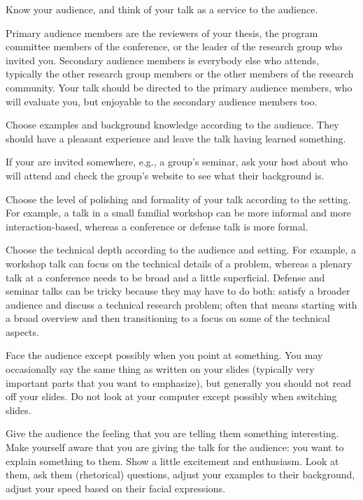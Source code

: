 \documentclass[12pt]{article}
\begin{document}
Know your audience, and think of your talk as a service to the audience.
\begin{compactitem}
\item Primary audience members are the reviewers of your thesis, the program committee members of the conference, or the leader of the research group who invited you.
Secondary audience members is everybody else who attends, typically the other research group members or the other members of the research community.
Your talk should be directed to the primary audience members, who will evaluate you, but enjoyable to the secondary audience members too.
\item Choose examples and background knowledge according to the audience. They should have a pleasant experience and leave the talk having learned something.
\item If your are invited somewhere, e.g., a group's seminar, ask your host about who will attend and check the group's website to see what their background is.
\item Choose the level of polishing and formality of your talk according to the setting.
For example, a talk in a small familial workshop can be more informal and more interaction-based, whereas a conference or defense talk is more formal.
\item Choose the technical depth according to the audience and setting. For example, a workshop talk can focus on the technical details of a problem, whereas a plenary talk at a conference needs to be broad and a little superficial.
Defense and seminar talks can be tricky because they may have to do both: satisfy a broader audience and discuss a technical research problem; often that means starting with a broad overview and then transitioning to a focus on some of the technical aspects.
\end{compactitem}

Face the audience except possibly when you point at something.
You may occasionally say the same thing as written on your slides (typically very important parts that you want to emphasize), but generally you should not read off your slides.
Do not look at your computer except possibly when switching slides.
\medskip

Give the audience the feeling that you are telling them something interesting.
Make yourself aware that you are giving the talk for the audience: you want to explain something to them.
Show a little excitement and enthusiasm.
Look at them, ask them (rhetorical) questions, adjust your examples to their background, adjust your speed based on their facial expressions.
\medskip
\end{document}
